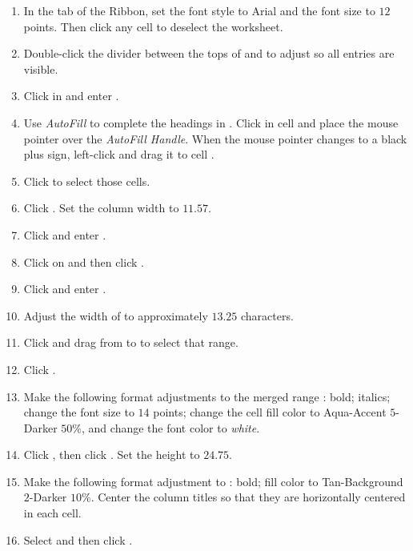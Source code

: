 \begin{enumbox}
\begin{enumerate}
		\item In the  tab of the Ribbon, set the font style to Arial and the font size to $ 12 $ points. Then click any cell to deselect the worksheet.
		\item Double-click the divider between the tops of  and  to adjust  so all entries are visible. 
		\item Click in  and enter .
		\item Use \textit{AutoFill} to complete the headings in . Click in cell  and place the mouse pointer over the \textit{AutoFill Handle}. When the mouse pointer changes to a black plus sign, left-click and drag it to cell .
		\item Click  to select those cells. 
		\item Click . Set the column width to $ 11.57 $.
		\item Click  and enter .
		\item Click on  and then click .
		\item Click  and enter .
		\item Adjust the width of  to approximately $ 13.25 $ characters.
		\item Click and drag from  to  to select that range. 
		\item Click .
		\item Make the following format adjustments to the merged range : bold; italics; change the font size to $ 14 $ points; change the cell fill color to Aqua-Accent $ 5 $-Darker $ 50 $\%, and change the font color to \textit{white}.
		\item Click , then click . Set the height to $ 24.75 $.
		\item Make the following format adjustment to : bold; fill color to Tan-Background $ 2 $-Darker $ 10 $\%. Center the column titles so that they are horizontally centered in each cell.
		\item Select  and then click . 

\end{enumerate}
\end{enumbox}
